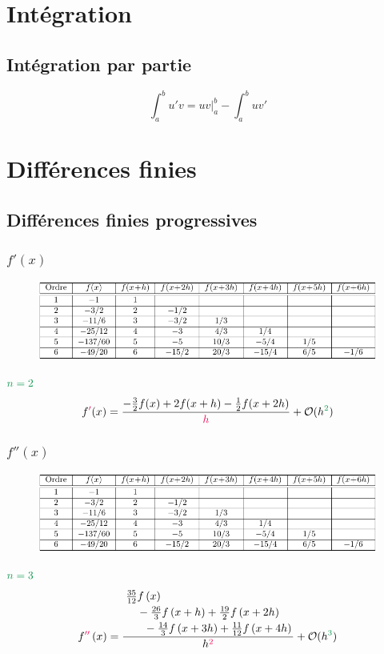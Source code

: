 \documentclass[]{article}
\begin{document}
\begin{multicols}{3}
\section{Intégration}
\subsection{Intégration par partie}
$$\int_{a}^{b}u'v=uv\Big|_{a}^{b}-\int_{a}^{b}uv'$$
\section{Différences finies}
\subsection{Différences finies progressives}
\subsubsection{$f'(x)$}
\begin{figure}[H]
\centering
\includegraphics[width=\columnwidth,page=1]{diff_finies_tableaux.pdf}
\end{figure}
$\textcolor{ForestGreen}{n=2}$
$$f\textcolor{OrangeRed}{'}(x)=\frac{-\frac{3}{2}f(x)+2f(x+h)-\frac{1}{2}f(x+2h)}{\textcolor{OrangeRed}{h}}+\mathcal{O}(h^{\textcolor{ForestGreen}{2}})$$
\subsubsection{$f''(x)$}
\begin{figure}[H]
\centering
\includegraphics[width=\columnwidth,page=2]{diff_finies_tableaux.pdf}
\end{figure}
$\textcolor{ForestGreen}{n=3}$
$$f\textcolor{OrangeRed}{''}\left(x\right)=\frac{\splitdfrac{\splitdfrac{\frac{35}{12}f\left(x\right)}{-\frac{26}{3}f\left(x+h\right)+\frac{19}{2}f\left(x+2h\right)}}{-\frac{14}{3}f\left(x+3h\right)+\frac{11}{12}f\left(x+4h\right)}}{h^{\textcolor{OrangeRed}{2}}}+\mathcal{O}(h^{\textcolor{ForestGreen}{3}})$$

\end{multicols}
\end{document}
